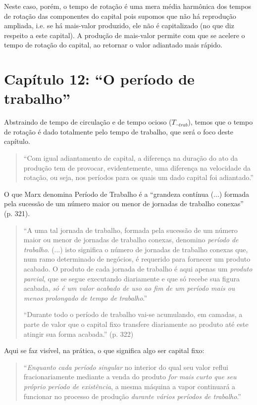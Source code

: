 Neste caso, porém, o tempo de rotação é uma mera média harmônica dos tempos de rotação das componentes do capital pois supomos que não há reprodução ampliada, i.e. se há mais-valor produzido, ele não é capitalizado (no que diz respeito a este capital). A produção de mais-valor permite com que se acelere o tempo de rotação do capital, ao retornar o valor adiantado mais rápido.

\section{Capítulo 12: ``O período de trabalho''}
Abstraindo de tempo de circulação e de tempo ocioso ($T_{\lnot trab}$), temos que o tempo de rotação é dado totalmente pelo tempo de trabalho, que será o foco deste capítulo.
\begin{quote}
``Com igual adiantamento de capital, a diferença na duração do ato da produção tem de provocar, evidentemente, uma diferença na velocidade da rotação, ou seja, nos períodos para os quais um dado capital foi adiantado.'' \parencite[p. 320]{Marx2014}
\end{quote}

O que Marx denomina Período de Trabalho é a ``grandeza contínua (...) formada pela sucessão de um número maior ou menor de jornadas de trabalho conexas'' (p. 321).
\begin{quote}
``A uma tal jornada de trabalho, formada pela sucessão de um número maior ou menor de jornadas de trabalho conexas, denomino \textit{período de trabalho}. (...) isto significa o número de jornadas de trabalho conexas que, num ramo determinado de negócios, é requerido para fornecer um produto acabado. O produto de cada jornada de trabalho é aqui apenas um \textit{produto parcial}, que se segue executando diariamente e que só recebe sua figura acabada, \textit{só é um valor acabado de uso ao fim de um período mais ou menos prolongado de tempo de trabalho}.'' \parencite[p. 321, grifo meu]{Marx2014}

``Durante todo o período de trabalho vai-se acumulando, em camadas, a parte de valor que o capital fixo transfere diariamente ao produto até este atingir sua forma acabada.'' (p. 322)
\end{quote}

Aqui se faz visível, na prática, o que significa algo ser capital fixo: 
\begin{quote}
``\textit{Enquanto cada período singular} no interior do qual seu valor reflui fracionariamente mediante a venda do produto \textit{for mais curto que seu próprio período de existência}, a mesma máquina a vapor continuará a funcionar no processo de produção \textit{durante vários períodos de trabalho}.'' \parencite[p. 322, grifo meu]{Marx2014}
\end{quote}

